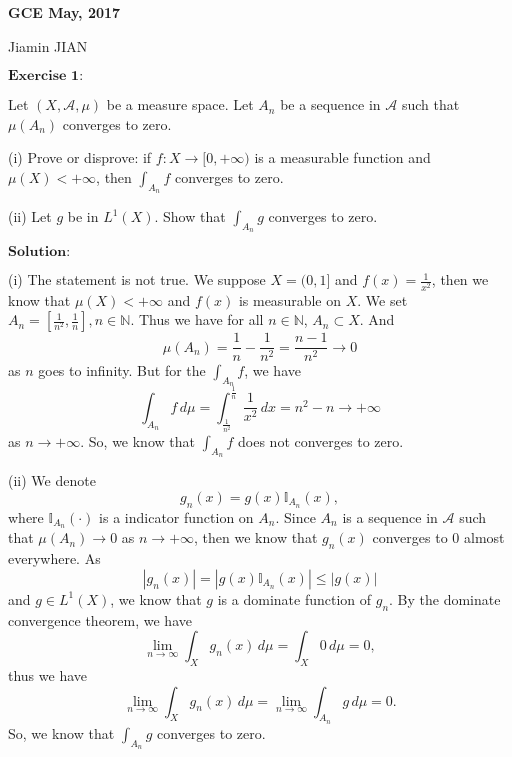 \documentclass[12pt,a4paper]{ctexart}
\begin{document}
\begin{center}
\textbf{ GCE May, 2017}
\vspace{8pt}

Jiamin JIAN
\end{center}

\vspace{12pt}

$\textbf{Exercise 1:}$

Let $(X, \mathcal{A}, \mu)$ be a measure space. Let $A_{n}$ be a sequence in $\mathcal{A}$ such that $\mu(A_{n})$ converges to zero.

(i) Prove or disprove: if $f : X \rightarrow [0, + \infty)$ is a measurable function and $\mu(X) < + \infty$, then $\int_{A_{n}}^{} f$ converges to zero.

(ii) Let $g$ be in $L^{1}(X)$. Show that $\int_{A_{n}}^{} g$ converges to zero.

\vspace{8pt}

$\textbf{Solution:}$

(i) The statement is not true. We suppose $X = (0, 1]$ and $f(x) = \frac{1}{x^{2}}$, then we know that $\mu(X) < + \infty$ and $f(x)$ is measurable on $X$. We set $A_{n} = [\frac{1}{n^{2}}, \frac{1}{n}], n \in \mathbb{N}$. Thus we have for all $n \in \mathbb{N}$, $A_{n} \subset X$. And
\begin{equation*}
   \mu(A_{n}) = \frac{1}{n} - \frac{1}{n^{2}} = \frac{n - 1}{n^{2}} \to 0
\end{equation*}
as $n$ goes to infinity. But for the $\int_{A_{n}}^{} f$, we have
\begin{equation*}
   \int_{A_{n}}^{} f \, d \mu = \int_{\frac{1}{n^{2}}}^{\frac{1}{n}} \frac{1}{x^{2}} \, d x = n^{2} - n \to + \infty
\end{equation*}
as $n \to + \infty$. So, we know that $\int_{A_{n}}^{} f$ does not converges to zero.

\vspace{8pt}

(ii) We denote
\begin{equation*}
   g_{n}(x) = g(x) \mathbb{I}_{A_{n}} (x),
\end{equation*}
where $\mathbb{I}_{A_{n}} (\cdot)$ is a indicator function on $A_{n}$. Since $A_{n}$ is a sequence in $\mathcal{A}$ such that $\mu(A_{n}) \to 0$ as $n \to + \infty$, then we know that $g_{n}(x)$ converges to $0$ almost everywhere. As
\begin{equation*}
   |g_{n}(x)| = |g(x) \mathbb{I}_{A_{n}} (x)| \leq |g(x)|
\end{equation*}
and $g \in L^{1}(X)$, we know that $g$ is a dominate function of $g_{n}$. By the dominate convergence theorem, we have
\begin{equation*}
   \lim_{n \to \infty} \int_{X}^{} g_{n}(x) \, d \mu = \int_{X}^{} 0 \, d \mu = 0,
\end{equation*}
thus we have
\begin{equation*}
   \lim_{n \to \infty} \int_{X}^{} g_{n}(x) \, d \mu = \lim_{n \to \infty} \int_{A_{n}}^{} g \, d \mu = 0.
\end{equation*}
So, we know that $\int_{A_{n}}^{} g$ converges to zero.
\end{document}
